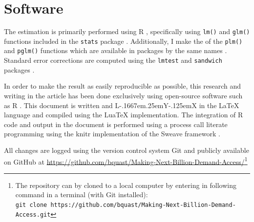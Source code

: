 \documentclass[a4paper,british]{article}\usepackage[]{graphicx}\usepackage[]{color}
\makeatletter
\providecommand{\LyX}{\texorpdfstring%
  {L\kern-.1667em\lower.25em\hbox{Y}\kern-.125emX\@}
  {LyX}}
\providecommand*{\code}[1]{\texttt{#1}}
\makeatother
\begin{document}
\newpage{}

\section{Software}

The estimation is primarily performed using R \citep*{R}, specifically
using \code{lm()} and \code{glm()} functions included in the \code{stats}
package \citep{venables2013Splus}. Additionally, I make the of the
\code{plm()} and \code{pglm()} functions which are available in
packages by the same names \citep{croissant2008plm,croissant2013pglm}.
Standard error corrections are computed using the \code{lmtest} and
\code{sandwich} packages \citet{zeileis2002lmtest,zeileis2004sandwichI,zeileis2006sandwichII}.

In order to make the result as easily reproducible as possible, this
research and writing in the article has been done exclusively using
open-source software such as R \citep*{R}. This document is written
and \LyX{} \citep{lyx} in the \LaTeX\citep{lamport1985latex} language
and compiled using the LuaTeX implementation\citep{luatex}. The integration
of R code and output in the document is performed using a process
call literate programming \citet{knuth1984literate} using the knitr
implementation \citet{xie2015knitr} of the Sweave framework \citep{leisch2002sweave}.

All changes are logged using the version control system Git \citep{git}
and publicly available on GitHub at \href{https://github.com/bquast/Making-Next-Billion-Demand-Access/}{https://github.com/bquast/Making-Next-Billion-Demand-Access/}\footnote{The repository can by cloned to a local computer by entering in following
command in a terminal (with Git installed):\\
\code{git clone https://github.com/bquast/Making-Next-Billion-Demand-Access.git}}
\end{document}
